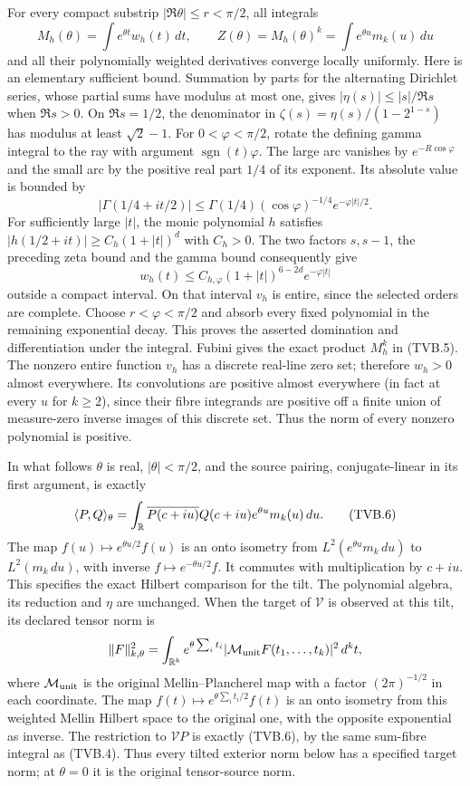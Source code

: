 For every compact substrip $|\Re\theta|\le r<\pi/2$, all integrals
\[
 M_h(\theta)=\int e^{\theta t}w_h(t)\,dt,\qquad
 Z(\theta)=M_h(\theta)^k=\int e^{\theta u}m_k(u)\,du
 \tag{TVB.5}
\]
and all their polynomially weighted derivatives converge locally
uniformly. Here is an elementary sufficient bound. Summation by parts
for the alternating Dirichlet series, whose partial sums have modulus
at most one, gives $|\eta(s)|\le |s|/\Re s$ when $\Re s>0$.
On $\Re s=1/2$, the denominator in
$\zeta(s)=\eta(s)/(1-2^{1-s})$ has modulus at least $\sqrt2-1$.
For $0<\varphi<\pi/2$, rotate the defining gamma integral to the
ray with argument $\operatorname{sgn}(t)\varphi$. The large arc
vanishes by $e^{-R\cos\varphi}$ and the small arc by the positive
real part $1/4$ of its exponent. Its absolute value is bounded by
\[
 |\Gamma(1/4+it/2)|
 \le\Gamma(1/4)(\cos\varphi)^{-1/4}e^{-\varphi|t|/2}.
\]
For sufficiently large $|t|$, the monic polynomial $h$ satisfies
$|h(1/2+it)|\ge C_h(1+|t|)^d$ with $C_h>0$.
The two factors $s,s-1$, the preceding zeta bound and the gamma
bound consequently give
\[
 w_h(t)\le C_{h,\varphi}(1+|t|)^{6-2d}e^{-\varphi|t|}
\]
outside a compact interval. On that interval $v_h$ is entire, since
the selected orders are complete. Choose $r<\varphi<\pi/2$ and
absorb every fixed polynomial in the remaining exponential decay.
This proves the asserted domination and differentiation under the
integral. Fubini gives the exact product $M_h^k$ in (TVB.5).
The nonzero entire function $v_h$ has a discrete real-line zero set;
therefore $w_h>0$ almost everywhere. Its convolutions are positive
almost everywhere (in fact at every $u$ for $k\ge2$), since their
fibre integrands are positive off a finite union of measure-zero
inverse images of this discrete set. Thus the norm of every nonzero
polynomial is positive.

In what follows $\theta$ is real, $|\theta|<\pi/2$, and the source
pairing, conjugate-linear in its first argument, is exactly
\[
 \langle P,Q\rangle_\theta
 =\int_{\mathbb{R}}\overline{P(c+iu)}Q(c+iu)e^{\theta u}m_k(u)\,du.
 \tag{TVB.6}
\]
The map $f(u)\mapsto e^{\theta u/2}f(u)$ is an onto isometry from
$L^2(e^{\theta u}m_k\,du)$ to $L^2(m_k\,du)$, with inverse
$f\mapsto e^{-\theta u/2}f$. It commutes with multiplication by
$c+iu$. This specifies the exact Hilbert comparison for the tilt.
The polynomial algebra, its reduction and $\eta$ are unchanged.
When the target of $\mathcal V$ is observed at this tilt, its declared
tensor norm is
\[
 \|F\|_{k,\theta}^2=\int_{\mathbb{R}^k}
 e^{\theta\sum_i t_i}|\mathcal M_{\rm unit}F(t_1,\ldots,t_k)|^2\,d^kt,
\]
where $\mathcal M_{\rm unit}$ is the original Mellin--Plancherel map
with a factor $(2\pi)^{-1/2}$ in each coordinate. The map
$f(t)\mapsto e^{\theta\sum_i t_i/2}f(t)$ is an onto isometry from
this weighted Mellin Hilbert space to the original one, with the
opposite exponential as inverse. The restriction to $\mathcal V P$
is exactly (TVB.6), by the same sum-fibre integral as (TVB.4).
Thus every tilted exterior norm below has a specified target norm;
at $\theta=0$ it is the original tensor-source norm.

